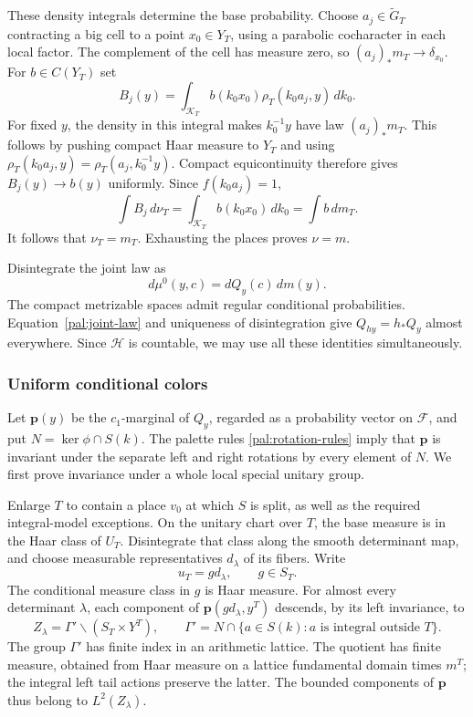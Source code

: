 These density integrals determine the base probability.  Choose
$a_j\in\widetilde G_T$ contracting a big cell to a point $x_0\in Y_T$,
using a parabolic cocharacter in each local factor.  The complement of
the cell has measure zero, so $(a_j)_*m_T\to\delta_{x_0}$.  For
$b\in C(Y_T)$ set
\[
 B_j(y)=\int_{\mathcal K_T}b(k_0x_0)\rho_T(k_0a_j,y)\,dk_0.
\]
For fixed $y$, the density in this integral makes $k_0^{-1}y$ have law
$(a_j)_*m_T$.  This follows by pushing compact Haar measure to $Y_T$
and using $\rho_T(k_0a_j,y)=\rho_T(a_j,k_0^{-1}y)$.
Compact equicontinuity therefore gives $B_j(y)\to b(y)$ uniformly.
Since $f(k_0a_j)=1$,
\[
 \int B_j\,d\nu_T
 =\int_{\mathcal K_T}b(k_0x_0)\,dk_0
 =\int b\,dm_T.
\]
It follows that $\nu_T=m_T$.  Exhausting the places proves $\nu=m$.

Disintegrate the joint law as
\begin{equation}\label{pal:disintegration}
 d\mu^0(y,c)=dQ_y(c)\,dm(y).
\end{equation}
The compact metrizable spaces admit regular conditional probabilities.
Equation~\eqref{pal:joint-law} and uniqueness of disintegration give
$Q_{hy}=h_*Q_y$ almost everywhere.  Since $\mathcal H$ is countable,
we may use all these identities simultaneously.

\subsubsection{Uniform conditional colors}

Let $\mathbf p(y)$ be the $c_1$-marginal of $Q_y$, regarded as a
probability vector on $\mathcal F$, and put
$N=\ker\phi\cap S(k)$.  The palette rules
\eqref{pal:rotation-rules} imply that $\mathbf p$ is invariant under
the separate left and right rotations by every element of $N$.
We first prove invariance under a whole local special unitary group.

Enlarge $T$ to contain a place $v_0$ at which $S$ is split, as well as
the required integral-model exceptions.  On the unitary chart over $T$,
the base measure is in the Haar class of $U_T$.  Disintegrate that class
along the smooth determinant map, and choose measurable representatives
$d_\lambda$ of its fibers.  Write
\[
 u_T=g d_\lambda,\qquad g\in S_T.
\]
The conditional measure class in $g$ is Haar measure.  For almost every
determinant $\lambda$, each component of
$\mathbf p(gd_\lambda,y^T)$ descends, by its left invariance, to
\begin{equation}\label{pal:lattice-space}
 Z_\lambda=\Gamma'\backslash(S_T\times Y^T),\qquad
 \Gamma'=N\cap\{a\in S(k):a\text{ is integral outside }T\}.
\end{equation}
The group $\Gamma'$ has finite index in an arithmetic lattice.
The quotient has finite measure, obtained from Haar measure on a
lattice fundamental domain times $m^T$; the integral left tail actions
preserve the latter.  The bounded components of $\mathbf p$ thus
belong to $L^2(Z_\lambda)$.

